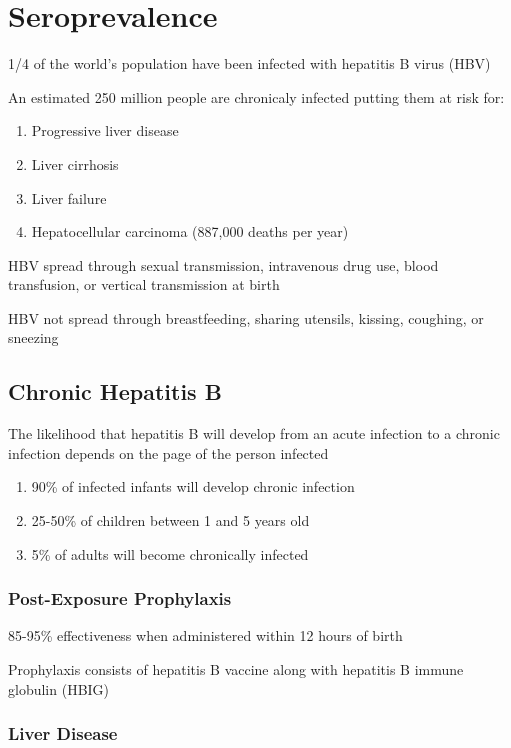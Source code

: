 \documentclass{notes}
\begin{document}
\section{Seroprevalence}

1/4 of the world's population have been infected with hepatitis B virus (HBV)

\tab An estimated 250 million people are chronicaly infected putting them at risk for:

\begin{enumerate}
    \item Progressive liver disease
    \item Liver cirrhosis
    \item Liver failure
    \item Hepatocellular carcinoma (887,000 deaths per year)
\end{enumerate}

HBV spread through sexual transmission, intravenous drug use, blood transfusion, or vertical transmission at birth

HBV not spread through breastfeeding, sharing utensils, kissing, coughing, or sneezing

\subsection{Chronic Hepatitis B}

The likelihood that hepatitis B will develop from an acute infection to a chronic infection depends on the page of the person infected

\begin{enumerate}
    \item 90\% of infected infants will develop chronic infection
    \item 25-50\% of children between 1 and 5 years old
    \item 5\% of adults will become chronically infected
\end{enumerate}

\subsubsection{Post-Exposure Prophylaxis}

85-95\% effectiveness when administered within 12 hours of birth

Prophylaxis consists of hepatitis B vaccine along with hepatitis B immune globulin (HBIG)

\subsubsection{Liver Disease}
\end{document}
